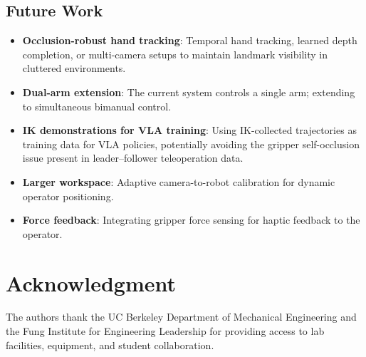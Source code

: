 \documentclass[10pt,journal]{IEEEtran}
\begin{document}
\subsection{Future Work}
\begin{itemize}
  \item \textbf{Occlusion-robust hand tracking}: Temporal hand tracking,
        learned depth completion, or multi-camera setups to maintain
        landmark visibility in cluttered environments.
  \item \textbf{Dual-arm extension}: The current system controls a
        single arm; extending to simultaneous bimanual control.
  \item \textbf{IK demonstrations for VLA training}: Using IK-collected
        trajectories as training data for VLA policies, potentially
        avoiding the gripper self-occlusion issue present in
        leader--follower teleoperation data.
  \item \textbf{Larger workspace}: Adaptive camera-to-robot calibration
        for dynamic operator positioning.
  \item \textbf{Force feedback}: Integrating gripper force sensing for
        haptic feedback to the operator.
\end{itemize}

\section*{Acknowledgment}
The authors thank the UC Berkeley Department of Mechanical Engineering
and the Fung Institute for Engineering Leadership for providing
access to lab facilities, equipment, and student collaboration.
\end{document}
